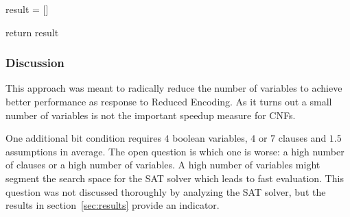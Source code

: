%
\begin{algorithm}[p]
  result = []\;


  return result\;
 \caption[Apply function to bitslices algorithm for DSE]%
   {Apply function to bitslices algorithm for DSE. Recognize the nested
   for loop over models indicating a much worse scalability in the Initialize step.}
 \label{algo:dse-function}
\end{algorithm}


\subsubsection{Discussion}
\label{sec:dse-discussion}
%
This approach was meant to radically reduce the number of variables to achieve better performance as response to Reduced Encoding. As it turns out a small number of variables is not the important speedup measure for CNFs.

One additional bit condition requires $4$ boolean variables, $4$ or $7$ clauses and $1.5$ assumptions in average. The open question is which one is worse: a high number of clauses or a high number of variables. A high number of variables might segment the search space for the SAT solver which leads to fast evaluation. This question was not discussed thoroughly by analyzing the SAT solver, but the results in section~\ref{sec:results} provide an indicator.

